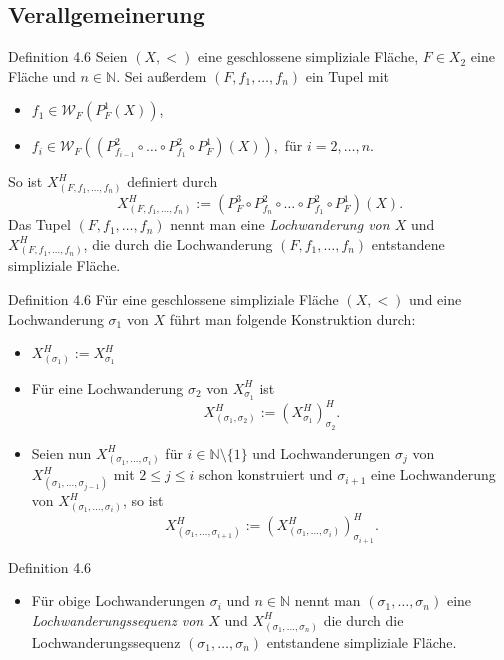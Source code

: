 \documentclass{beamer}
\begin{document}
\subsection{Verallgemeinerung}
\begin{frame}
\end{frame}
\begin{frame}
\begin{block}{Definition 4.6}
Seien $(X,<)$ eine geschlossene simpliziale Fläche, $F \in X_2$ eine Fläche und $n\in \mathbb{N}$. Sei außerdem $(F,f_1,\ldots,f_n)$ ein Tupel mit
\begin{itemize}
\item $f_1 \in \mathcal{W}_F(P_F^1(X))$,
\item $f_i \in \mathcal{W}_F((P^2_{f_{i-1}} \circ \ldots \circ P^2_{f_1}\circ P_F^1 )(X)),$ für $i=2,\ldots ,n$.
\end{itemize}
So ist $X_{(F,f_1,\ldots,f_n)}^H$ definiert durch 
\[
X^{H}_{(F,f_1,\ldots,f_n)}:=(P_F^3\circ P^2_{f_n} \circ \ldots \circ P^2_{f_1}\circ P_F^1)(X).
\]
Das Tupel $(F,f_1,\ldots,f_n)$ nennt man eine \emph{Lochwanderung von $X$} und $X^H_{(F,f_1,\ldots,f_n)}$, die durch die Lochwanderung $(F,f_1,\ldots,f_n)$ entstandene simpliziale Fläche.
\end{block}
\end{frame}
\begin{frame}
\begin{block}{Definition 4.6}
Für eine geschlossene simpliziale Fläche $(X,<)$ und eine Lochwanderung $\sigma_1$ von $X$ führt man folgende Konstruktion durch:
\begin{itemize}
\item $X^H_{(\sigma_1)}:=X^H_{\sigma_1}$
\item Für eine Lochwanderung $\sigma_2$ von $X^H_{\sigma_1}$ ist 
\[
X_{(\sigma_1,\sigma_2)}^H:=(X_{\sigma_1}^H)^H_{\sigma_2}.
\]
\item Seien nun  $X_{(\sigma_1,\ldots, \sigma_i)}^H$ für $i\in \mathbb{N}\setminus\{1\}$ und Lochwanderungen $\sigma_j$ von $X^H_{(\sigma_1,\ldots,\sigma_{j-1})}$ mit $2 \leq j \leq i$ schon konstruiert und $\sigma_{i+1}$ eine Lochwanderung von $X_{(\sigma_1,\ldots, \sigma_i)}^H$, so ist
\[
X_{(\sigma_1,\ldots, \sigma_{i+1})}^H:=(X_{(\sigma_1,\ldots, \sigma_i)}^H)^H_{\sigma_{i+1}}.
\]
\end{itemize}
\end{block}
 \end{frame}
 \begin{frame}
 \begin{block}{Definition 4.6}
 \begin{itemize}
\item Für obige Lochwanderungen $\sigma_i$ und $n \in \mathbb{N}$ nennt man $(\sigma_1, \ldots,\sigma_n)$ eine \emph{Lochwanderungssequenz von $X$} und $X^H_{(\sigma_1,\ldots,\sigma_n)}$ die durch die Lochwanderungssequenz $(\sigma_1,\ldots,\sigma_n)$ entstandene simpliziale Fläche.
\end{itemize}
\end{block}
\end{frame}
\end{document}
